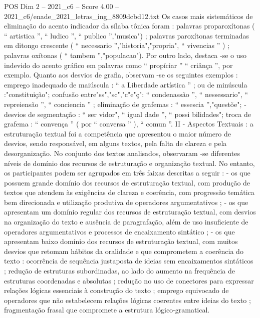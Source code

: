 \begin{textsample}{POS Dim 2 – 2021\_c6 – Score 4.00 – 2021\_c6/enade\_2021\_letras\_ing\_8809dcbd12.txt}
Os casos mais sistemáticos de eliminação do acento indicador da sílaba tônica foram : palavras proparoxítonas ( “ artistica ”, “ ludico ”, “ publico ”,"musica") ; palavras paroxítonas terminadas em ditongo crescente ( “ necessario ”,"historia","propria", “ vivencias ” ) ; palavras oxítonas ( “ tambem ”,"populacao").
Por outro lado, destaca -se o uso indevido do acento gráfico em palavras como “ propíciar ” “ criânça ”, por exemplo.
Quanto aos desvios de grafia, observam -se os seguintes exemplos : emprego inadequado de maiúscula : “ a Liberdade artística ” ; ou de minúscula :"constituição"; confusão entre"ss","sc","c"e"ç": “ condenassão ”, “ nessessario", “ repreiensão ”, “ conciencia ” ; eliminação de grafemas : “ essescia ”,"questõe"; - desvios de segmentação : “ ser vidor", “ igual dade ”, “ possi bilidades"; troca de grafema : “ convença ” ( por “ conversa ” ), “ comun ”.
II - Aspectos Textuais : a estruturação textual foi a competência que apresentou o maior número de desvios, sendo responsável, em alguns textos, pela falta de clareza e pela desorganização.
No conjunto dos textos analisados, observaram -se diferentes níveis de domínio dos recursos de estruturação e organização textual.
No entanto, os participantes podem ser agrupados em três faixas descritas a seguir : - os que possuem grande domínio dos recursos de estruturação textual, com produção de textos que atendem às exigências de clareza e coerência, com progressão temática bem direcionada e utilização produtiva de operadores argumentativos ; - os que apresentam um domínio regular dos recursos de estruturação textual, com desvios na organização do texto e ausência de paragrafação, além de uso insuficiente de operadores argumentativos e processos de encaixamento sintático ; - os que apresentam baixo domínio dos recursos de estruturação textual, com muitos desvios que retomam hábitos da oralidade e que comprometem a coerência do texto : ocorrência de sequência justaposta de ideias sem encaixamentos sintáticos ; redução de estruturas subordinadas, ao lado do aumento na frequência de estruturas coordenadas e absolutas ; redução no uso de conectores para expressar relações lógicas essenciais à construção do texto ; emprego equivocado de operadores que não estabelecem relações lógicas coerentes entre ideias do texto ; fragmentação frasal que compromete a estrutura lógico-gramatical.

\end{textsample}
